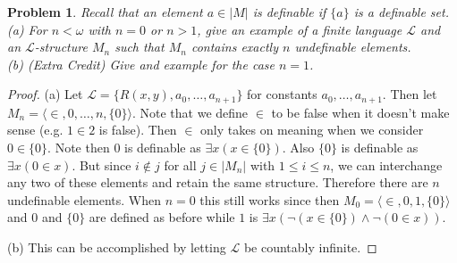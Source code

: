 \documentclass{article}
\newtheorem{problem}{Problem}
\begin{document}
\begin{problem}
Recall that an element $a \in |M|$ is \emph{definable} if $\{a\}$ is a definable set.\\
(a) For $n < \omega$ with $n = 0$ or $n > 1$, give an example of a finite language $\mathcal{L}$ and an $\mathcal{L}$-structure $M_n$ such that $M_n$ contains exactly $n$ undefinable elements.\\
(b) (Extra Credit) Give and example for the case $n=1$.
\end{problem}
\begin{proof}
(a) Let $\mathcal{L} = \{R(x,y), a_0, \dots, a_{n+1}\}$ for constants $a_0, \dots , a_{n+1}$. Then let $M_n = \langle \in, 0, \dots , n, \{0\} \rangle$. Note that we define $\in$ to be false when it doesn't make sense (e.g. $1 \in 2$ is false). Then $\in$ only takes on meaning when we consider $0 \in \{0\}$. Note then $0$ is definable as $\exists x (x \in \{0\})$. Also $\{0\}$ is definable as $\exists x (0 \in x)$. But since $i \notin j$ for all $j \in |M_n|$ with $1 \leq i \leq n$, we can interchange any two of these elements and retain the same structure. Therefore there are $n$ undefinable elements. When $n=0$ this still works since then $M_0 = \langle \in, 0, 1, \{0\} \rangle$ and $0$ and $\{0\}$ are defined as before while $1$ is $\exists x (\neg(x \in \{0\}) \wedge \neg(0 \in x))$.

(b) This can be accomplished by letting $\mathcal{L}$ be countably infinite.
\end{proof}
\end{document}
